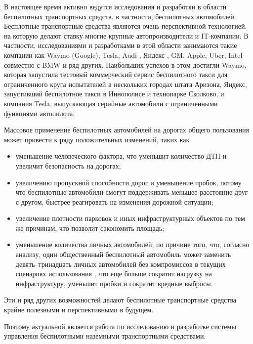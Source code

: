 \aftertitle

В настоящее время активно ведутся исследования и разработки в области беспилотных транспортных средств,
в частности, беспилотных автомобилей. Бесплотные транспортные средства являются очень перспективной
технологией, на которую делают ставку многие крупные автопроизводители и IT-компании. В частности,
исследованиями и разработками в этой области занимаются такие компании как Waymo (Google), Tesla, Audi \cite{company_1},
Яндекс \cite{company_yandex}, GM, Apple, Uber, Intel совместно с BMW и ряд других.
Наибольших успехов в этом достигли Waymo, которая запустила тестовый коммерческий сервис беспилотного
такси для ограниченного круга испытателей в нескольких городах штата Аризона, Яндекс, запустивший беспилотное
такси в Иннополисе и технопарке Сколково, и компания Tesla, выпускающая серийные автомобили с ограниченными
функциями автопилота.

Массовое применение беспилотных автомобилей на дорогах общего пользования может привести к ряду положительных изменений, таких как
\begin{itemize}
    \item уменьшение человеческого фактора, что уменьшит количество ДТП и увеличит безопасность на дорогах;
    \item увеличению пропускной способности дорог и уменьшение пробок, потому что беспилотные автомобили
          смогут поддерживать меньшее расстояние друг с другом, быстрее реагировать на изменения дорожной
          ситуации;
    \item увеличение плотности парковок и иных инфраструктурных объектов по тем же причинам, что позволит
          сэкономить площадь;
    \item уменьшение количества личных автомобилей, по причине того, что, согласно анализу, один общественный
          беспилотный автомобиль может заменить девять--тринадцать личных автомобилей без компромиссов в
          текущих сценариях использования \cite{overview_private_ovnership}, что еще больше сократит нагрузку
          на инфраструктуру, уменьшит пробки и сократит вредные выбросы.
\end{itemize}

Эти и ряд других возможностей делают беспилотные транспортные средства крайне полезными и перспективными в
будущем.

Поэтому актуальной является работа по исследованию и разработке системы управления беспилотными
наземными транспортными средствами.


